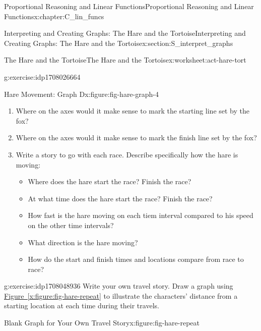 \documentclass[oneside,10pt,]{book}
\newcommand{\xreffont}{\relax}
\numberwithin{equation}{chapter}
\begin{document}
\begin{chapterptx}{Proportional Reasoning and Linear Functions}{}{Proportional Reasoning and Linear Functions}{}{}{x:chapter:C_lin_funcs}
\begin{sectionptx}{Interpreting and Creating Graphs: The Hare and the Tortoise}{}{Interpreting and Creating Graphs: The Hare and the Tortoise}{}{}{x:section:S_interpret_graphs}
\begin{worksheet-subsection}{The Hare and the Tortoise}{}{The Hare and the Tortoise}{}{}{x:worksheet:act-hare-tort}
\begin{divisionexercise}{2}{}{}{g:exercise:idp1708026664}
\begin{sidebyside}{2}{0}{0}{0}
\begin{sbspanel}{0.5}
\begin{figureptx}{Hare Movement: Graph D}{x:figure:fig-hare-graph-4}{}
\tcblower
\end{figureptx}%
\end{sbspanel}%
\end{sidebyside}%
\begin{enumerate}[font=\bfseries,label=(\alph*),ref=\alph*]
\item{}Where on the axes would it make sense to mark the starting line set by the fox?%
\item{}Where on the axes would it make sense to mark the finish line set by the fox?%
\item{}Write a story to go with each race. Describe specifically how the hare is moving:%
\begin{itemize}[label=\textbullet]
\item{}Where does the hare start the race? Finish the race?%
\item{}At what time does the hare start the race? Finish the race?%
\item{}How fast is the hare moving on each tiem interval compared to his speed on the other time intervals?%
\item{}What direction is the hare moving?%
\item{}How do the start and finish times and locations compare from race to race?%
\end{itemize}
%
\end{enumerate}
\end{divisionexercise}%
\begin{divisionexercise}{3}{}{}{g:exercise:idp1708048936}%
Write your own travel story. Draw a graph using \hyperref[x:figure:fig-hare-repeat]{Figure~{\xreffont\ref{x:figure:fig-hare-repeat}}} to illustrate the characters' distance from a starting location at each time during their travels.%
\begin{figureptx}{Blank Graph for Your Own Travel Story}{x:figure:fig-hare-repeat}{}%
\begin{image}{0.15}{0.7}{0.15}%

\end{image}
\end{figureptx}
\end{divisionexercise}
\end{worksheet-subsection}
\end{sectionptx}
\end{chapterptx}
\end{document}
